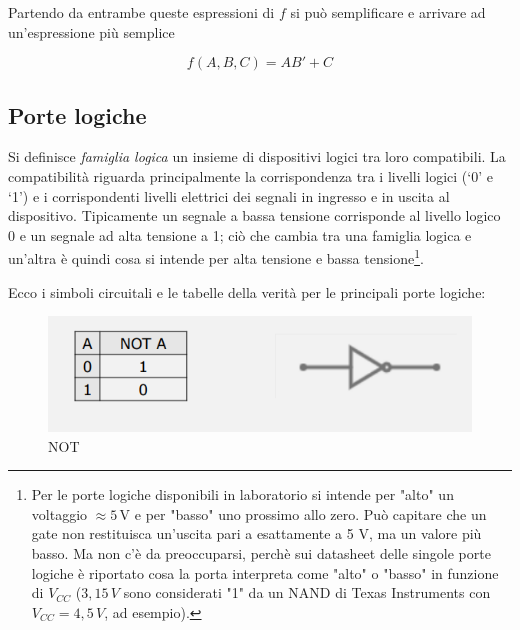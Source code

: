 \documentclass{article}
\begin{document}
Partendo da entrambe queste espressioni di $f$ si può semplificare e arrivare ad un'espressione più semplice

\[f(A, B, C) = AB' + C\]

\clearpage










\subsection{Porte logiche}

Si definisce \textit{famiglia logica} un insieme di dispositivi logici tra loro compatibili. La compatibilità riguarda principalmente la corrispondenza tra i livelli logici (‘0’ e ‘1’) e i corrispondenti livelli elettrici dei segnali in ingresso e in uscita al dispositivo. Tipicamente un segnale a bassa tensione corrisponde al livello logico 0 e un segnale ad alta tensione a 1; ciò che cambia tra una famiglia logica e un'altra è quindi cosa si intende per alta tensione e bassa tensione\footnote{Per le porte logiche disponibili in laboratorio si intende per "alto" un voltaggio $\approx 5 \, \text{V}$ e per "basso" uno prossimo allo zero. Può capitare che un gate non restituisca un'uscita pari a esattamente a 5 V, ma un valore più basso. Ma non c'è da preoccuparsi, perchè sui datasheet delle singole porte logiche è riportato cosa la porta interpreta come "alto" o "basso" in funzione di $V_{CC}$ ($3,15 \,V$ sono considerati "1" da un NAND di Texas Instruments con $V_{CC}=4,5\,V$, ad esempio).}.

\vspace{1mm}

Ecco i simboli circuitali e le tabelle della verità per le principali porte logiche:

\begin{figure}[h]
  \centering
  \includegraphics[scale=0.7]{IM_NOT}
  \caption{NOT}
  \label{NOT}
\end{figure}
\end{document}
